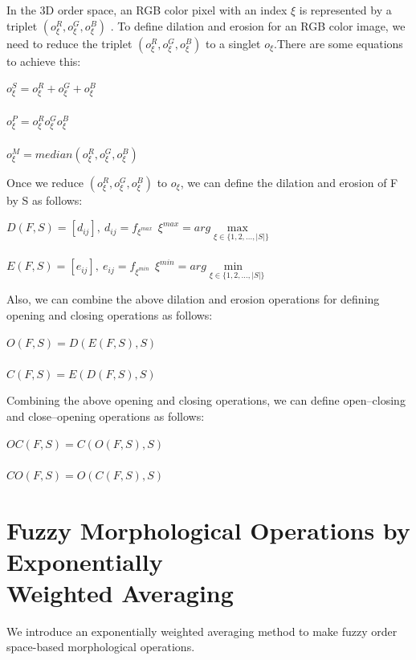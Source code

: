  In the 3D order space, an RGB color pixel with an index $\xi$
 is represented by a triplet $(o_{\xi}^{R}, o_{\xi}^{G}, o_{\xi}^{B})$
. To define dilation and erosion for an RGB color image, we need to reduce the triplet $(o_{\xi}^{R}, o_{\xi}^{G}, o_{\xi}^{B})$ to a singlet $o_{\xi}$.There are some equations to achieve this:
\begin{center}
$o_{\xi}^{S}=o_{\xi}^{R}+o_{\xi}^{G}+o_{\xi}^{B}$\\
\
\\
$o_{\xi}^{P}=o_{\xi}^{R}o_{\xi}^{G}o_{\xi}^{B}$\\
\
\\
$o_{\xi}^{M}=median(o_{\xi}^{R},o_{\xi}^{G},o_{\xi}^{B})$
\\
\end{center}
Once we reduce $(o_{\xi}^{R}, o_{\xi}^{G}, o_{\xi}^{B})$ to $o_{\xi}$, we can define the dilation and erosion of F by S as follows:
\begin{center}
$D(F,S) = [d_{ij}], \  d_{ij}=f_{\xi^{max}}\ \ \xi^{max}=arg \mathop{max\ \ o_{\xi}}\limits_{\xi\in\{1,2,\ldots,|S|\}} $
\\
\ 
\\
$E(F,S) = [e_{ij}], \  e_{ij}=f_{\xi^{min}}\ \ \xi^{min}=arg \mathop{min\ \ o_{\xi}}\limits_{\xi\in\{1,2,\ldots,|S|\}} $
\end{center}
Also, we can combine the above dilation and erosion operations for defining opening and closing operations as follows:
\begin{center}
$O(F,S)=D(E(F,S),S)$
\\
\ 
\\
$C(F,S)=E(D(F,S),S)$
\end{center}
Combining the above opening and closing operations, we can define open–closing and close–opening operations as follows:
\begin{center}
$OC(F,S)=C(O(F,S),S)$
\\
\ 
\\
$CO(F,S)=O(C(F,S),S)$
\end{center}


\section*{Fuzzy Morphological Operations by Exponentially\\ Weighted Averaging}

We introduce an exponentially weighted averaging method to make fuzzy order space-based morphological operations.\\

